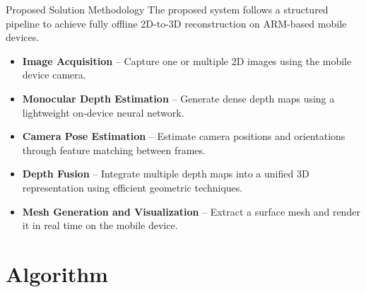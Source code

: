 \documentclass[11pt]{beamer}
\begin{document}
\begin{frame}{Proposed Solution Methodology}
The proposed system follows a structured pipeline to achieve fully offline 2D-to-3D reconstruction on ARM-based mobile devices.

\medskip
\begin{itemize}
\item \textbf{Image Acquisition} -- Capture one or multiple 2D images using the mobile device camera.
\item \textbf{Monocular Depth Estimation} -- Generate dense depth maps using a lightweight on-device neural network.
\item \textbf{Camera Pose Estimation} -- Estimate camera positions and orientations through feature matching between frames.
\item \textbf{Depth Fusion} -- Integrate multiple depth maps into a unified 3D representation using efficient geometric techniques.
\item \textbf{Mesh Generation and Visualization} -- Extract a surface mesh and render it in real time on the mobile device.
\end{itemize}
\end{frame}

\section{Algorithm}
\end{document}
